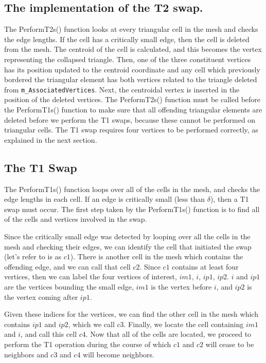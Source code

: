 \subsection{The implementation of the T2 swap.}
The PerformT2s() function looks at every triangular cell in the mesh and checks the edge lengths. If the cell has a critically small edge, then the cell is deleted from the mesh. The centroid of the cell is calculated, and this becomes the vertex representing the collapsed triangle. Then, one of the three constituent vertices has its position updated to the centroid coordinate and any cell which previously bordered the triangular element has both vertices related to the triangle deleted from \texttt{m\_AssociatedVertices}. Next, the centroidal vertex is inserted in the position of the deleted vertices. The PerformT2s() function must be called before the PerformT1s() function to make sure that all offending triangular elements are deleted before we perform the T1 swaps, because these cannot be performed on triangular cells. The T1 swap requires four vertices to be performed correctly, as explained in the next section.

\subsection{The T1 Swap}
The PerformT1s() function loops over all of the cells in the mesh, and checks the edge lengths in each cell. If an edge is critically small (less than $\delta$), then a T1 swap must occur. The first step taken by the PerformT1s() function is to find all of the cells and vertices involved in the swap.

Since the critically small edge was detected by looping over all the cells in the mesh and checking their edges, we can identify the cell that initiated the swap (let's refer to is as $c1$). There is another cell in the mesh which contains the offending edge, and we can call that cell $c2$. Since $c1$ contains at least four vertices, then we can label the four vertices of interest, $im1$, $i$, $ip1$, $ip2$. $i$ and $ip1$ are the vertices bounding the small edge, $im1$ is the vertex before $i$, and $ip2$ is the vertex coming after $ip1$. 

Given these indices for the vertices, we can find the other cell in the mesh which contains $ip1$ and $ip2$, which we call $c3$. Finally, we locate the cell containing $im1$ and $i$, and call this cell $c4$. Now that all of the cells are located, we proceed to perform the T1 operation during the course of which $c1$ and $c2$ will cease to be neighbors and $c3$ and $c4$ will become neighbors. 

